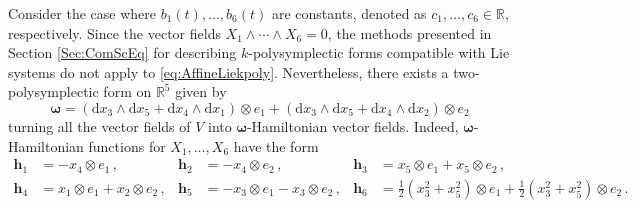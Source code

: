 \documentclass[11pt]{article}
\theoremstyle{plain}
\theoremstyle{definition}
\newcommand{\R}{\mathbb{R}}
\newcommand{\bomega}{{\boldsymbol{\omega}}}
\newcommand{\bh}{{\boldsymbol{h}}}
\renewcommand{\d}{\mathrm{d}}
\def\d{\mathrm{d}}
\numberwithin{equation}{section}
\begin{document}
Consider the case where $b_1(t),\ldots,b_6(t)$ are constants, denoted as $c_1,\ldots,c_6\in\R$, respectively.
Since the vector fields $X_1\wedge \dotsb\wedge X_6=0$, the methods presented in Section \ref{Sec:ComScEq} for describing $k$-polysymplectic forms compatible with Lie systems do not apply to \eqref{eq:AffineLiekpoly}. Nevertheless, there exists a two-polysymplectic form on $\R^5$ given by
\[
\bm\omega=(\d x_3\wedge \d x_5+\d x_4\wedge \d x_1)\otimes e_1+(\d x_3\wedge \d x_5 +\d x_4\wedge \d x_2)\otimes e_2
\]
turning all the vector fields of $V$ into $\bomega$-Hamiltonian vector fields. Indeed, $\bomega$-Hamiltonian functions for $X_1,\ldots,X_6$ have the form
\begin{align}
    \bh_1 &= -x_4\otimes e_1\,, & \bh_2 &= -x_4\otimes e_2\,, & \bh_3&=x_5\otimes e_1 + x_5\otimes e_2\,,\\
    \bh_4 &= x_1\otimes e_1+x_2\otimes e_2\,, & \bh_5 &= -x_3\otimes e_1-x_3\otimes e_2\,, & \bh_6&=\frac{1}{2}(x_3^2+x_5^2)\otimes e_1+\frac{1}{2}(x_3^2+x_5^2)\otimes e_2\,. 
\end{align}
\end{document}
